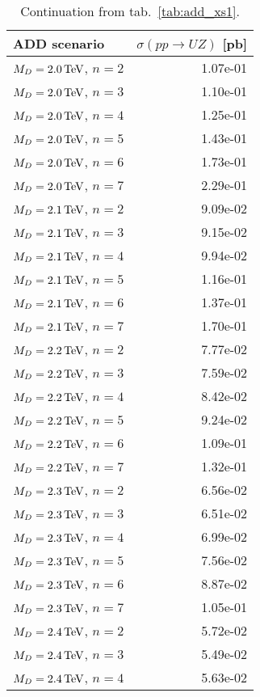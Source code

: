 \begin{table}[hbtp]
  \caption{
    Continuation from tab.~\ref{tab:add_xs1}.
  }
  \label{tab:add_xs2}
  \begin{center}
{\footnotesize
  \begin{tabular}{lr}
\hline 
ADD scenario              & $\sigma(pp\rightarrow UZ)$ [pb]\\
\hline

$M_{D} = 2.0 \,\text{Te\hspace{-.08em}V}$, $n=2$  & 1.07e-01 \\
$M_{D} = 2.0 \,\text{Te\hspace{-.08em}V}$, $n=3$  & 1.10e-01 \\
$M_{D} = 2.0 \,\text{Te\hspace{-.08em}V}$, $n=4$  & 1.25e-01 \\
$M_{D} = 2.0 \,\text{Te\hspace{-.08em}V}$, $n=5$  & 1.43e-01 \\
$M_{D} = 2.0 \,\text{Te\hspace{-.08em}V}$, $n=6$  & 1.73e-01 \\
$M_{D} = 2.0 \,\text{Te\hspace{-.08em}V}$, $n=7$  & 2.29e-01 \\
$M_{D} = 2.1 \,\text{Te\hspace{-.08em}V}$, $n=2$  & 9.09e-02 \\
$M_{D} = 2.1 \,\text{Te\hspace{-.08em}V}$, $n=3$  & 9.15e-02 \\
$M_{D} = 2.1 \,\text{Te\hspace{-.08em}V}$, $n=4$  & 9.94e-02 \\
$M_{D} = 2.1 \,\text{Te\hspace{-.08em}V}$, $n=5$  & 1.16e-01 \\
$M_{D} = 2.1 \,\text{Te\hspace{-.08em}V}$, $n=6$  & 1.37e-01 \\
$M_{D} = 2.1 \,\text{Te\hspace{-.08em}V}$, $n=7$  & 1.70e-01 \\
$M_{D} = 2.2 \,\text{Te\hspace{-.08em}V}$, $n=2$  & 7.77e-02 \\
$M_{D} = 2.2 \,\text{Te\hspace{-.08em}V}$, $n=3$  & 7.59e-02 \\
$M_{D} = 2.2 \,\text{Te\hspace{-.08em}V}$, $n=4$  & 8.42e-02 \\
$M_{D} = 2.2 \,\text{Te\hspace{-.08em}V}$, $n=5$  & 9.24e-02 \\
$M_{D} = 2.2 \,\text{Te\hspace{-.08em}V}$, $n=6$  & 1.09e-01 \\
$M_{D} = 2.2 \,\text{Te\hspace{-.08em}V}$, $n=7$  & 1.32e-01 \\
$M_{D} = 2.3 \,\text{Te\hspace{-.08em}V}$, $n=2$  & 6.56e-02 \\
$M_{D} = 2.3 \,\text{Te\hspace{-.08em}V}$, $n=3$  & 6.51e-02 \\
$M_{D} = 2.3 \,\text{Te\hspace{-.08em}V}$, $n=4$  & 6.99e-02 \\
$M_{D} = 2.3 \,\text{Te\hspace{-.08em}V}$, $n=5$  & 7.56e-02 \\
$M_{D} = 2.3 \,\text{Te\hspace{-.08em}V}$, $n=6$  & 8.87e-02 \\
$M_{D} = 2.3 \,\text{Te\hspace{-.08em}V}$, $n=7$  & 1.05e-01 \\
$M_{D} = 2.4 \,\text{Te\hspace{-.08em}V}$, $n=2$  & 5.72e-02 \\
$M_{D} = 2.4 \,\text{Te\hspace{-.08em}V}$, $n=3$  & 5.49e-02 \\
$M_{D} = 2.4 \,\text{Te\hspace{-.08em}V}$, $n=4$  & 5.63e-02 \\

\end{tabular}}
\end{center}
\end{table}
